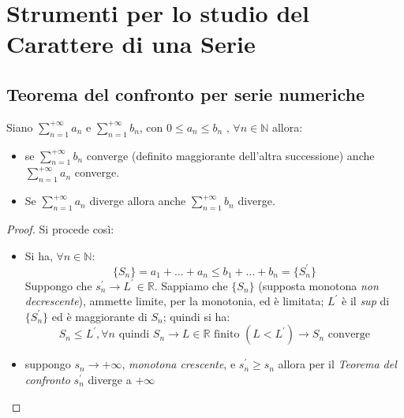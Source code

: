 \documentclass[a4paper,12pt, oneside]{book}
\begin{document}
\section{Strumenti per lo studio del Carattere di una Serie}
\subsection{Teorema del confronto per serie numeriche}
\begin{teorema}
	Siano $\sum_{n=1}^{+\infty} a_n$ e $\sum_{n=1}^{+\infty} b_n$, con $0\leq a_n\leq b_n \mbox{ , } \forall n\in \mathbb{N}$ allora:
	\begin{itemize}
		\item se  $\sum_{n=1}^{+\infty} b_n$ converge (definito maggiorante dell'altra successione) anche $\sum_{n=1}^{+\infty} a_n$ converge.
		\item Se $\sum_{n=1}^{+\infty} a_n$ diverge allora anche $\sum_{n=1}^{+\infty} b_n$ diverge.
	\end{itemize}
\end{teorema}
\begin{proof}
	Si procede così:
	\begin{itemize}
		\item Si ha, $\forall n\in \mathbb{N}$:
		      $$\{S_n\}=a_1+...+a_n\leq b_1+...+b_n=\{S^{'}_n\}$$
		      Suppongo che $s^{'}_n\rightarrow L^{'} \in \mathbb{R}$. Sappiamo che $\{S_n\}$ (supposta monotona \textit{non decrescente}), ammette limite, per la monotonia, ed è limitata; $L^{'}$ è il \textit{sup} di $\{S^{'}_n\}$ ed è maggiorante di $S_n$; quindi si ha:
		      $$S_n\leq L^{'}, \forall n\mbox{  quindi  } S_n\rightarrow L\in \mathbb{R}\mbox{  finito  } (L<L^{'}) \longrightarrow S_n \mbox{ converge}$$
		\item suppongo $s_n\rightarrow +\infty$, \textit{monotona crescente}, e $s^{'}_n\geq s_n$ allora per il \textit{Teorema del confronto} $s^{'}_n$ diverge a $+\infty$
	\end{itemize}
\end{proof}
\end{document}
